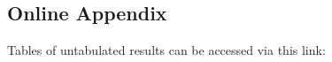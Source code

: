 \documentclass[a4paper]{article}
\begin{document}
\subsection{Online Appendix}
Tables of untabulated results can be accessed via this link:


\newpage



\newpage

\end{document}
